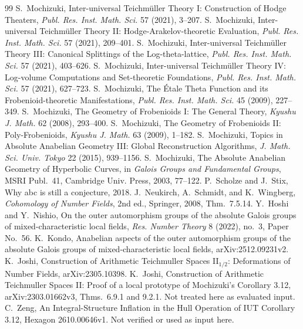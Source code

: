 \documentclass[11pt]{article}
\theoremstyle{definition}
\begin{document}
\begin{thebibliography}{99}\small
{} S.~Mochizuki, Inter-universal Teichm\"uller Theory I: Construction of Hodge Theaters, \emph{Publ. Res. Inst. Math. Sci.} 57 (2021), 3--207.
 S.~Mochizuki, Inter-universal Teichm\"uller Theory II: Hodge-Arakelov-theoretic Evaluation, \emph{Publ. Res. Inst. Math. Sci.} 57 (2021), 209--401.
 S.~Mochizuki, Inter-universal Teichm\"uller Theory III: Canonical Splittings of the Log-theta-lattice, \emph{Publ. Res. Inst. Math. Sci.} 57 (2021), 403--626.
 S.~Mochizuki, Inter-universal Teichm\"uller Theory IV: Log-volume Computations and Set-theoretic Foundations, \emph{Publ. Res. Inst. Math. Sci.} 57 (2021), 627--723.
 S.~Mochizuki, The \'Etale Theta Function and its Frobenioid-theoretic Manifestations, \emph{Publ. Res. Inst. Math. Sci.} 45 (2009), 227--349.
 S.~Mochizuki, The Geometry of Frobenioids I: The General Theory, \emph{Kyushu J. Math.} 62 (2008), 293--400.
 S.~Mochizuki, The Geometry of Frobenioids II: Poly-Frobenioids, \emph{Kyushu J. Math.} 63 (2009), 1--182.
 S.~Mochizuki, Topics in Absolute Anabelian Geometry III: Global Reconstruction Algorithms, \emph{J. Math. Sci. Univ. Tokyo} 22 (2015), 939--1156.
 S.~Mochizuki, The Absolute Anabelian Geometry of Hyperbolic Curves, in \emph{Galois Groups and Fundamental Groups}, MSRI Publ.~41, Cambridge Univ. Press, 2003, 77--122.
 P.~Scholze and J.~Stix, Why abc is still a conjecture, 2018.
 J.~Neukirch, A.~Schmidt, and K.~Wingberg, \emph{Cohomology of Number Fields}, 2nd ed., Springer, 2008, Thm.~7.5.14.
 Y.~Hoshi and Y.~Nishio, On the outer automorphism groups of the absolute Galois groups of mixed-characteristic local fields, \emph{Res. Number Theory} 8 (2022), no.~3, Paper No.~56.
 K.~Kondo, Anabelian aspects of the outer automorphism groups of the absolute Galois groups of mixed-characteristic local fields, arXiv:2512.09231v2.
 K.~Joshi, Construction of Arithmetic Teichmuller Spaces II$_{1/2}$: Deformations of Number Fields, arXiv:2305.10398.
 K.~Joshi, Construction of Arithmetic Teichmuller Spaces II: Proof of a local prototype of Mochizuki's Corollary 3.12, arXiv:2303.01662v3, Thms.~6.9.1 and 9.2.1. Not treated here as evaluated input.
 C.~Zeng, An Integral-Structure Inflation in the Hull Operation of IUT Corollary 3.12, Hexagon 2610.00646v1. Not verified or used as input here.

\end{thebibliography}
\end{document}
